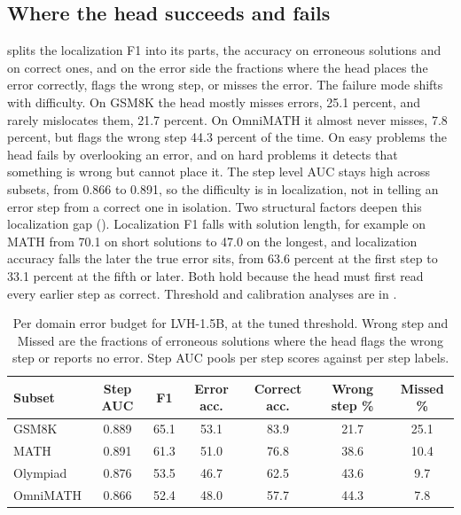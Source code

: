 \subsection{Where the head succeeds and fails}
\label{sec:exp-erranalysis}

 splits the localization F1 into its parts, the accuracy on erroneous solutions and on correct ones, and on the error side the fractions where the head places the error correctly, flags the wrong step, or misses the error. The failure mode shifts with difficulty. On GSM8K the head mostly misses errors, 25.1 percent, and rarely mislocates them, 21.7 percent. On OmniMATH it almost never misses, 7.8 percent, but flags the wrong step 44.3 percent of the time. On easy problems the head fails by overlooking an error, and on hard problems it detects that something is wrong but cannot place it. The step level AUC stays high across subsets, from 0.866 to 0.891, so the difficulty is in localization, not in telling an error step from a correct one in isolation. Two structural factors deepen this localization gap (). Localization F1 falls with solution length, for example on MATH from 70.1 on short solutions to 47.0 on the longest, and localization accuracy falls the later the true error sits, from 63.6 percent at the first step to 33.1 percent at the fifth or later. Both hold because the head must first read every earlier step as correct. Threshold and calibration analyses are in .

\begin{table}[t]
  \centering
  \caption{Per domain error budget for LVH-1.5B, at the tuned threshold. Wrong step and Missed are the fractions of erroneous solutions where the head flags the wrong step or reports no error. Step AUC pools per step scores against per step labels.}
  \label{tab:perdomain}
  \begin{tabular}{lcccccc}
    \toprule
    Subset & Step AUC & F1 & Error acc. & Correct acc. & Wrong step \% & Missed \% \\
    \midrule
    GSM8K    & 0.889 & 65.1 & 53.1 & 83.9 & 21.7 & 25.1 \\
    MATH     & 0.891 & 61.3 & 51.0 & 76.8 & 38.6 & 10.4 \\
    Olympiad & 0.876 & 53.5 & 46.7 & 62.5 & 43.6 & \phantom{0}9.7 \\
    OmniMATH & 0.866 & 52.4 & 48.0 & 57.7 & 44.3 & \phantom{0}7.8 \\
    \bottomrule
  \end{tabular}
\end{table}


